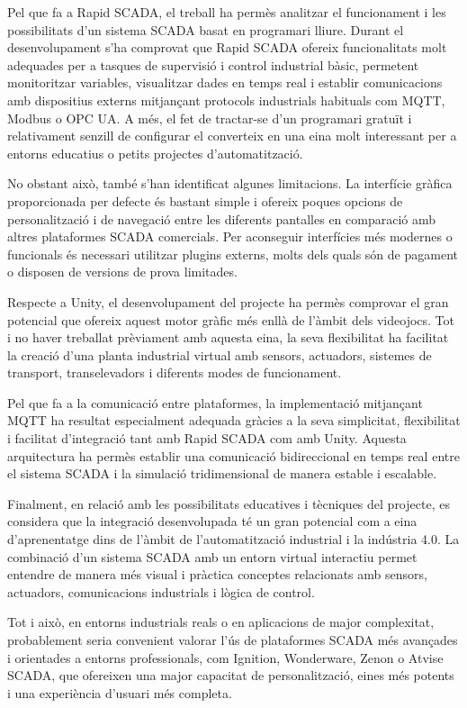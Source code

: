 \documentclass[a4paper,11pt,DIV=13,headings=normal,abstract=true,twoside=semi]{article}
\begin{document}
Pel que fa a Rapid SCADA, el treball ha permès analitzar el funcionament i les possibilitats d'un sistema SCADA basat en programari lliure. Durant el desenvolupament s'ha comprovat que Rapid SCADA ofereix funcionalitats molt adequades per a tasques de supervisió i control industrial bàsic, permetent monitoritzar variables, visualitzar dades en temps real i establir comunicacions amb dispositius externs mitjançant protocols industrials habituals com MQTT, Modbus o OPC UA. A més, el fet de tractar-se d'un programari gratuït i relativament senzill de configurar el converteix en una eina molt interessant per a entorns educatius o petits projectes d'automatització.

No obstant això, també s'han identificat algunes limitacions. La interfície gràfica proporcionada per defecte és bastant simple i ofereix poques opcions de personalització i de navegació entre les diferents pantalles en comparació amb altres plataformes SCADA comercials. Per aconseguir interfícies més modernes o funcionals és necessari utilitzar plugins externs, molts dels quals són de pagament o disposen de versions de prova limitades. 

Respecte a Unity, el desenvolupament del projecte ha permès comprovar el gran potencial que ofereix aquest motor gràfic més enllà de l'àmbit dels videojocs. Tot i no haver treballat prèviament amb aquesta eina, la seva flexibilitat ha facilitat la creació d'una planta industrial virtual amb sensors, actuadors, sistemes de transport, transelevadors i diferents modes de funcionament. 

Pel que fa a la comunicació entre plataformes, la implementació mitjançant MQTT ha resultat especialment adequada gràcies a la seva simplicitat, flexibilitat i facilitat d'integració tant amb Rapid SCADA com amb Unity. Aquesta arquitectura ha permès establir una comunicació bidireccional en temps real entre el sistema SCADA i la simulació tridimensional de manera estable i escalable.

Finalment, en relació amb les possibilitats educatives i tècniques del projecte, es considera que la integració desenvolupada té un gran potencial com a eina d'aprenentatge dins de l'àmbit de l'automatització industrial i la indústria 4.0. La combinació d'un sistema SCADA amb un entorn virtual interactiu permet entendre de manera més visual i pràctica conceptes relacionats amb sensors, actuadors, comunicacions industrials i lògica de control.

Tot i això, en entorns industrials reals o en aplicacions de major complexitat, probablement seria convenient valorar l'ús de plataformes SCADA més avançades i orientades a entorns professionals, com Ignition, Wonderware, Zenon o Atvise SCADA, que ofereixen una major capacitat de personalització, eines més potents i una experiència d'usuari més completa.
\end{document}

